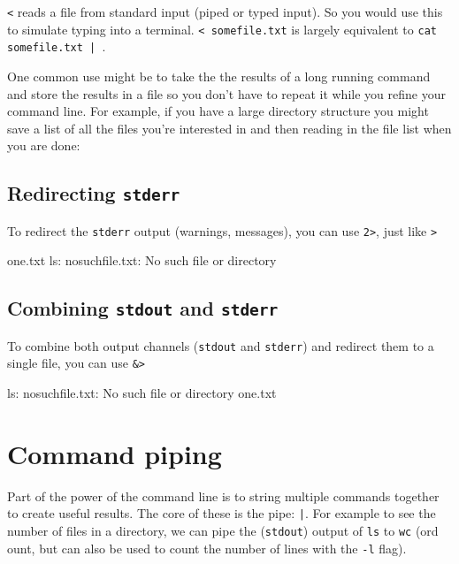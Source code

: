\lstinline|<| reads a file from standard input (piped or typed input).  So you would use
this to simulate typing into a terminal. \lstinline|< somefile.txt| is largely equivalent to
\lstinline=cat somefile.txt | =.

One common use might be to take the the results of a long running command and
store the results in a file so you don't have to repeat it while you refine your
command line. For example, if you have a large directory structure you might
save a list of all the files you're interested in and then reading in the file
list when you are done:

\begin{prompt}
\end{prompt}

\subsection{Redirecting \texttt{stderr}}

To redirect the \lstinline|stderr| output (warnings, messages), you can use \lstinline|2>|, just
like \lstinline|>|

\begin{prompt}
one.txt
ls: nosuchfile.txt: No such file or directory
\end{prompt}

\subsection{Combining \texttt{stdout} and \texttt{stderr}}

To combine both output channels (\lstinline|stdout| and \lstinline|stderr|) and redirect them to a single file, you can use
\lstinline|&>|

\begin{prompt}
ls: nosuchfile.txt: No such file or directory
one.txt
\end{prompt}

\section{Command piping}

Part of the power of the command line is to string multiple commands together to
create useful results. The core of these is the pipe: \lstinline=|=. For example to see
the number of files in a directory, we can pipe the (\lstinline|stdout|) output of
\lstinline|ls| to \lstinline|wc| (ord ount, but can also be used
to count the number of lines with the \lstinline|-l| flag).

